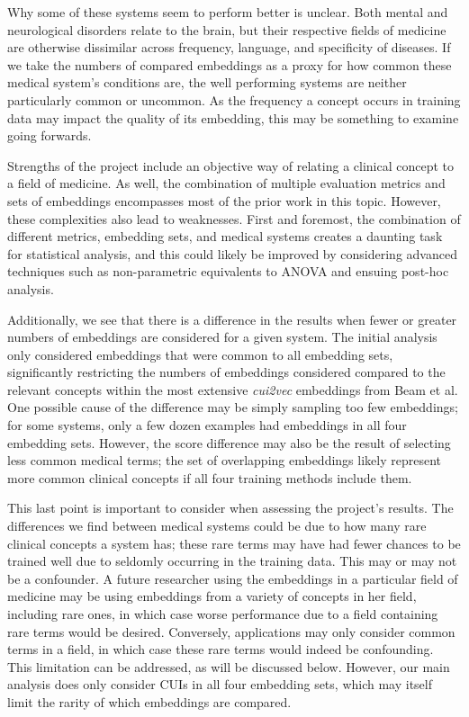 \documentclass[11pt,a4paper]{article}
\begin{document}
Why some of these systems seem to perform better is unclear. Both mental and neurological disorders relate to the brain, but their respective fields of medicine are otherwise dissimilar across frequency, language, and specificity of diseases.  If we take the numbers of compared embeddings as a proxy for how common these medical system's conditions are, the well performing systems are neither particularly common or uncommon. As the frequency a concept occurs in training data may impact the quality of its embedding, this may be something to examine going forwards. 

Strengths of the project include an objective way of relating a clinical concept to a field of medicine. As well, the combination of multiple evaluation metrics and sets of embeddings encompasses most of the prior work in this topic.  However, these complexities also lead to weaknesses. First and foremost, the combination of different metrics, embedding sets, and medical systems creates a daunting task for statistical analysis, and this could likely be improved by considering advanced techniques such as non-parametric equivalents to ANOVA and ensuing post-hoc analysis. 

Additionally, we see that there is a difference in the results when fewer or greater numbers of embeddings are considered for a given system. The initial analysis only considered embeddings that were common to all embedding sets, significantly restricting the numbers of embeddings considered compared to the relevant concepts within the most extensive \emph{cui2vec} embeddings from Beam et al. One possible cause of the difference may be simply sampling too few embeddings; for some systems, only a few dozen examples had embeddings in all four embedding sets. However, the score difference may also be the result of selecting less common medical terms; the set of overlapping embeddings likely represent more common clinical concepts if all four training methods include them. 

This last point is important to consider when assessing the project's results. The differences we find between medical systems could be due to how many rare clinical concepts a system has; these rare terms may have had fewer chances to be trained well due to seldomly occurring in the training data. This may or may not be a confounder. A future researcher using the embeddings in a particular field of medicine may be using embeddings from a variety of concepts in her field, including rare ones, in which case worse performance due to a field containing rare terms would be desired. Conversely, applications may only consider common terms in a field, in which case these rare terms would indeed be confounding. This limitation can be addressed, as will be discussed below. However, our main analysis does only consider CUIs in all four embedding sets, which may itself limit the rarity of which embeddings are compared. 
\end{document}

